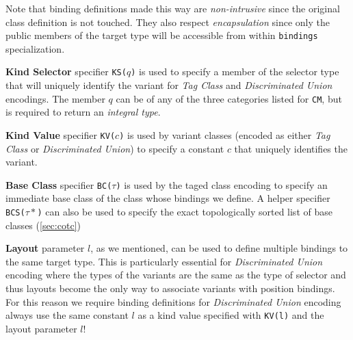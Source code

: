 \documentclass[preprint]{sigplanconf}
\makeatletter
\DeclareRobustCommand{\code}[1]{{\lstinline[breaklines=false,escapechar=@]{#1}}}
\makeatother
\begin{document}
Note that binding definitions made this way are \emph{non-intrusive} since the 
original class definition is not touched. They also respect \emph{encapsulation} 
since only the public members of the target type will be accessible from within 
\code{bindings} specialization.

{\bf Kind Selector} specifier \code{KS(}$q$\code{)} is used to specify a member 
of the selector type that will uniquely identify the variant for \emph{Tag 
Class} and \emph{Discriminated Union} encodings. The member $q$ can be of any of 
the three categories listed for \code{CM}, but is required to return an 
\emph{integral type}.

{\bf Kind Value} specifier \code{KV(}$c$\code{)} is used by variant classes 
(encoded as either \emph{Tag Class} or \emph{Discriminated Union}) to specify a 
constant $c$ that uniquely identifies the variant.

{\bf Base Class} specifier \code{BC(}$\tau$\code{)} is used by the taged class 
encoding to specify an immediate base class of the class whose bindings we 
define. A helper specifier \code{BCS(}$\tau*$\code{)} can also be used to 
specify the exact topologically sorted list of base classes 
(\textsection\ref{sec:cotc})

{\bf Layout} parameter $l$, as we mentioned, can be used to define multiple 
bindings to the same target type. This is particularly essential for 
\emph{Discriminated Union} encoding where the types of the variants are the same 
as the type of selector and thus layouts become the only way to associate 
variants with position bindings. For this reason we require binding definitions 
for \emph{Discriminated Union} encoding always use the same constant $l$ as a 
kind value specified with \code{KV(l)} and the layout parameter $l$!

\end{document}
